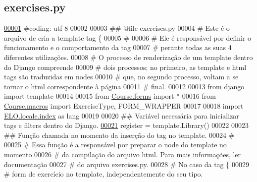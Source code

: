 \hypertarget{exercises_8py_source}{}\subsection{exercises.\+py}
\label{exercises_8py_source}

\begin{DoxyCode}
\hypertarget{exercises_8py_source_l00001}{}\hyperlink{namespaceCourse_1_1templatetags_1_1exercises}{00001} \textcolor{comment}{#coding: utf-8}
00002 
00003 \textcolor{comment}{## @file exercises.py}
00004 \textcolor{comment}{#   Este é o arquivo de cria a template tag \{%
00005 \textcolor{comment}{#}
00006 \textcolor{comment}{#   Ele é responsável por definir o funcionamento e o comportamento da tag}
00007 \textcolor{comment}{# perante todas as suas 4 diferentes utilizações.}
00008 \textcolor{comment}{#   O processo de renderização de um template dentro do Django compreende}
00009 \textcolor{comment}{# dois processos; no primeiro, as template e html tags são traduzidas em nodes}
00010 \textcolor{comment}{# que, no segundo processo, voltam a se tornar o html correspondente à página}
00011 \textcolor{comment}{# final.}
00012 
00013 \textcolor{keyword}{from} django \textcolor{keyword}{import} template
00014 
00015 \textcolor{keyword}{from} \hyperlink{namespaceCourse_1_1forms}{Course.forms} \textcolor{keyword}{import} *
00016 \textcolor{keyword}{from} \hyperlink{namespaceCourse_1_1macros}{Course.macros} \textcolor{keyword}{import} ExerciseType, FORM\_WRAPPER
00017 
00018 \textcolor{keyword}{import} \hyperlink{namespaceELO_1_1locale_1_1index}{ELO.locale.index} \textcolor{keyword}{as} lang
00019 
00020 \textcolor{comment}{## Variável necessária para inicializar tags e filters dentro do Django.}
\hypertarget{exercises_8py_source_l00021}{}\hyperlink{namespaceCourse_1_1templatetags_1_1exercises_a69bf3f5149bab102a018136707f13e10}{00021} register = template.Library()
00022 
00023 \textcolor{comment}{## Função chamada no momento da inserção do tag no template.}
00024 \textcolor{comment}{#}
00025 \textcolor{comment}{#   Essa função é a responsável por preparar o node do template no momento}
00026 \textcolor{comment}{# da compilação do arquivo html. Para mais informações, ler documentação}
00027 \textcolor{comment}{# do arquivo exercises.py.}
00028 \textcolor{comment}{#   No caso da tag \{%
00029 \textcolor{comment}{# form de exercício no template, independentemente do seu tipo.}
}}
\end{DoxyCode}
